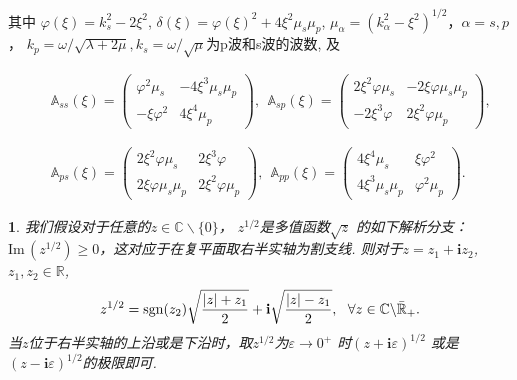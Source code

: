 \documentclass[8pt]{beamer}
\newcommand{\R}{\mathbb{R}}
\renewcommand{\i}{\mathbf{i}}
\renewcommand{\Im}{\mathrm{Im}\,}
\newtheorem{remark}{}[section]
\newcommand{\ep}{\varepsilon}
\newcommand{\lam}{\lambda}
\renewcommand{\i}{\mathbf{i}}
\renewcommand{\C}{{\mathbb{C}}}
\renewcommand{\Im}{\mathrm{Im}\,}
\newcommand{\ben}{\begin{eqnarray*}}
\newcommand{\een}{\end{eqnarray*}}
\begin{document}
\begin{frame}
其中 $\varphi(\xi)=k_s^2-2\xi^2$, $\delta(\xi)=\varphi(\xi)^2+4\xi^2\mu_s\mu_p $, $\mu_\alpha=(k_\alpha^2-\xi^2)^{1/2}$，$\alpha=s,p$， $k_p=\omega/\sqrt{\lam+2\mu}, k_s=\omega/\sqrt{\mu}$为p波和s波的波数, 及 

\ben
&&{\mathbb{A}_{ss}(\xi)} =
\left( \begin{array}{ll}
	\varphi^2\mu_s & -4\xi^3\mu_s\mu_p \\
	-\xi\varphi^2  & 4\xi^4\mu_p
\end{array} \right),\ \ 
{\mathbb{A}_{sp}(\xi)} =
\left( \begin{array}{ll}
	2\xi^2\varphi\mu_s & -2\xi\varphi\mu_s\mu_p \\
	-2\xi^3\varphi  & 2\xi^2\varphi\mu_p
\end{array} \right),\\ 
\\
\\
&&
{\mathbb{A}_{ps}(\xi)} =
\left( \begin{array}{ll}
	2\xi^2\varphi\mu_s & 2\xi^3\varphi \\
	2\xi\varphi\mu_s\mu_p  & 2\xi^2\varphi\mu_p
\end{array} \right),\ \ 
{\mathbb{A}_{pp}(\xi)} =
\left( \begin{array}{ll}
	4\xi^4\mu_s & \xi\varphi^2 \\
	4\xi^3\mu_s\mu_p  & \varphi^2\mu_p
\end{array} \right).
\een
\pause
\begin{remark}
	我们假设对于任意的$z\in \mathbb{C}\backslash\{0\}$， $z^{1/2}$是多值函数$\sqrt{z}$ 的如下解析分支：$\Im(z^{1/2})\geq 0$，这对应于在复平面取右半实轴为割支线. 则对于$z=z_1+\mathbf{i}z_2$, $z_1,z_2\in\R$,
	\ben \label{convention_1}
	z^{1/2}={\rm sgn}(z_2)\sqrt{\frac{|z|+z_1}{2}}+\i\sqrt{\frac{|z|-z_1}{2}},\ \ \forall z\in\C\backslash\bar{\R}_+.
	\een
	当$z$位于右半实轴的上沿或是下沿时，取$z^{1/2}$为$\ep\rightarrow0^+$ 时$(z+\i\ep)^{1/2}$ 或是 $(z-\i\ep)^{1/2}$的极限即可. 
\end{remark}

\end{frame}
\end{document}
